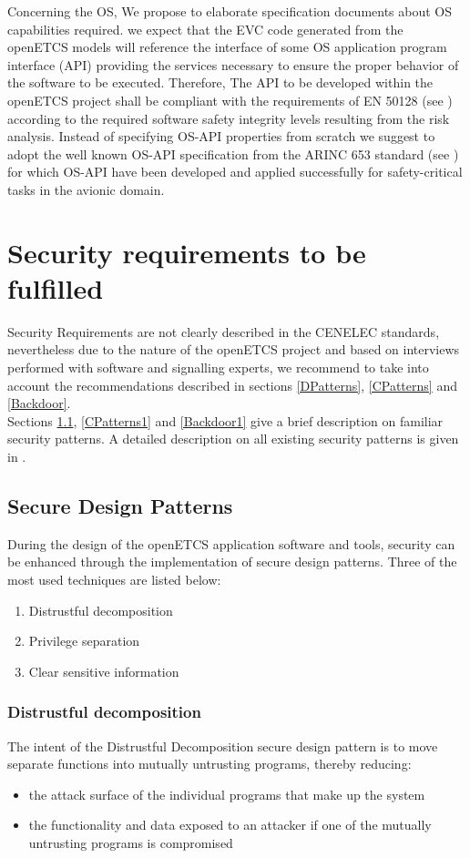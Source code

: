\documentclass{template/openetcs_report}
\begin{document}
Concerning the OS, We propose to elaborate specification documents about OS capabilities required.
we expect that the EVC code generated from the openETCS models will reference the interface of some OS application program interface (API) providing the services necessary to ensure the proper behavior of the software to be executed. Therefore, The API to be developed within the openETCS project shall be compliant with the requirements of EN 50128 (see \cite{EN50128}) according to the required software safety integrity levels resulting from the risk analysis.
Instead of specifying OS-API properties from scratch we suggest to adopt the well known OS-API speciﬁcation from the ARINC 653 standard (see \cite{ARINC}) for which OS-API have been developed and applied successfully for safety-critical tasks in the avionic domain.


\section{Security requirements to be fulfilled}
Security Requirements are not clearly described in the CENELEC standards, nevertheless due to the nature of the openETCS project and based on interviews performed with software and signalling experts, we recommend to take into account the recommendations described in sections \ref{DPatterns}, \ref{CPatterns} and \ref{Backdoor}.\\
Sections \ref{DPatterns1}, \ref{CPatterns1} and \ref{Backdoor1} give a brief description on familiar security patterns. A detailed description on all existing security patterns is given in \cite{SECU-doc}.
\subsection{Secure Design Patterns}
\label{DPatterns1}
During the design of the openETCS application software and tools, security can be enhanced through the implementation of secure design patterns. 
Three of the most used techniques are listed below:
\begin{enumerate}
  \item Distrustful decomposition
  \item Privilege separation
  \item Clear sensitive information
\end{enumerate}
\subsubsection{Distrustful decomposition}
The intent of the Distrustful Decomposition secure design pattern is to move separate functions into mutually untrusting programs, thereby reducing:
\begin{itemize}
  \item the attack surface of the individual programs that make up the system
  \item the functionality and data exposed to an attacker if one of the mutually untrusting programs is compromised
\end{itemize}
\end{document}
